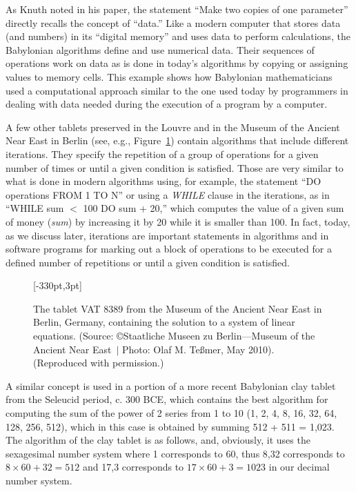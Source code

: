\medskip
As Knuth noted in his paper, the statement ``Make two copies of one parameter'' directly recalls the concept of ``data.'' Like a modern computer that stores data (and numbers) in its ``digital memory'' and uses data to perform calculations, the Babylonian algorithms define and use numerical data. Their sequences of operations work on data as is done in today's algorithms by copying or assigning values to memory cells. This example shows how Babylonian mathematicians used a computational approach similar to the one used today by programmers in dealing with data needed during the execution of a program by a computer.

A few other tablets preserved in the Louvre and in the Museum of the Ancient Near East in Berlin (see, e.g., Figure~\ref{fig:1.1}) contain algorithms that include different iterations. They specify the repetition of a group of operations for a given number of times or until a given condition is satisfied. Those are very similar to what is done in modern algorithms using, for example, the statement ``DO operations FROM 1 TO N'' or using a \textit{WHILE} clause in the iterations, as in ``WHILE sum $<$  100 DO sum +  20,'' which computes the value of a given sum of money (\textit{sum}) by increasing it by 20 while it is smaller than 100. In fact, today, as we discuss later, iterations are important statements in algorithms and in software programs for marking out a block of operations to be executed for a defined number of repetitions or until a given condition is satisfied.

\begin{figure}[t!]
[-330pt,3pt]
\caption{\label{fig:1.1}The tablet VAT 8389 from the Museum of the Ancient Near East in Berlin, Germany, containing the solution to a system of linear equations. (Source: \copyright  Staatliche Museen zu Berlin---Museum of the Ancient Near East~$|$ Photo: Olaf M. Te{\ss}mer, May 2010). (Reproduced with permission.)}\vspace*{-6pt}
\end{figure}

A similar concept is used in a portion of a more recent Babylonian clay tablet from the Seleucid period, c. 300 BCE, which contains the best algorithm for computing the sum of the power of 2 series from 1 to 10 (1, 2, 4, 8, 16, 32, 64, 128, 256, 512), which in this case is obtained by summing 512 + 511 = 1,023. The algorithm of the clay tablet is as follows, and, obviously, it uses the sexagesimal number system where 1 corresponds to 60, thus 8,32 corresponds to $8 \times 60 + 32 = 512$ and 17,3 corresponds to $17 \times 60 + 3 = 1023$ in our decimal number system.


